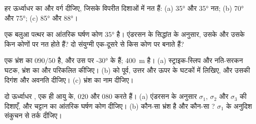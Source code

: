 \begin{exercise}[$\star$]
\label{exo:b1:faults-folds-fabrics:3}
हर ऊर्ध्वाधर  का  और वर्ग दीजिए, जिसके  विपरीत दिशाओं में नत हैं: (a)  \ang{35} और \ang{35} नत; (b) \ang{70} और \ang{75}; (c) \ang{85} और \ang{88}।
\end{exercise}

\begin{exercise}[$\star$]
\label{exo:b1:faults-folds-fabrics:4}
एक बलुआ पत्थर का आंतरिक घर्षण कोण \ang{35} है। एंडरसन के सिद्धांत के अनुसार, उसके  और उसके  किन कोणों पर नत होते हैं? दो संयुग्मी  एक-दूसरे से किस कोण पर बनाते हैं?
\end{exercise}

\begin{exercise}[$\star\star$]
\label{exo:b1:faults-folds-fabrics:5}
एक भ्रंश का  $090/50$ है, और उस पर \ang{-30}  के  हैं;  \qty{400}{m} है। (a) स्ट्राइक-स्लिप और नति-सरकन घटक, भ्रंश का  और  परिकलित कीजिए। (b)  को पूर्व, उत्तर और ऊपर के घटकों में लिखिए, और उसकी दिगंश और अवनति दीजिए। (c) भ्रंश का नाम दीजिए।
\end{exercise}

\begin{exercise}[$\star\star$]
\label{exo:b1:faults-folds-fabrics:6}
दो ऊर्ध्वाधर , एक ही आयु के, $020$ और $080$  करते हैं। (a) एंडरसन के अनुसार $\sigma_1$, $\sigma_2$ और $\sigma_3$ की दिशाएँ, और चट्टान का आंतरिक घर्षण कोण दीजिए। (b) कौन-सा भ्रंश  है और कौन-सा ? $\sigma_1$ के अनुदिश संकुचन से तर्क दीजिए।
\end{exercise}

